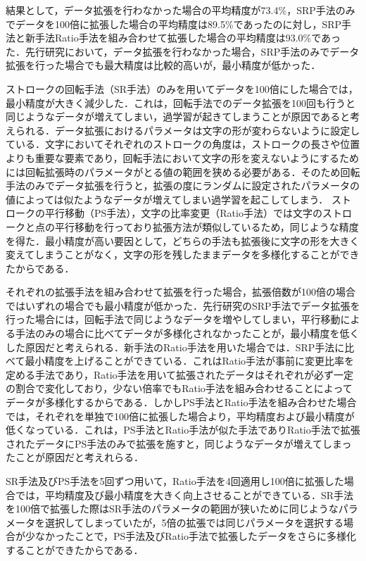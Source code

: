  結果として，データ拡張を行わなかった場合の平均精度が73.4\%，SRP手法のみでデータを100倍に拡張した場合の平均精度は89.5\%であったのに対し，SRP手法と新手法Ratio手法を組み合わせて拡張した場合の平均精度は93.0\%であった．先行研究\cite{takahashi}において，データ拡張を行わなかった場合，SRP手法のみでデータ拡張を行った場合でも最大精度は比較的高いが，最小精度が低かった．
 
ストロークの回転手法（SR手法）のみを用いてデータを100倍にした場合では，最小精度が大きく減少した．これは，回転手法でのデータ拡張を100回も行うと同じようなデータが増えてしまい，過学習が起きてしまうことが原因であると考えられる．データ拡張におけるパラメータは文字の形が変わらないように設定している．文字においてそれぞれのストロークの角度は，ストロークの長さや位置よりも重要な要素であり，回転手法において文字の形を変えないようにするためには回転拡張時のパラメータがとる値の範囲を狭める必要がある．そのため回転手法のみでデータ拡張を行うと，拡張の度にランダムに設定されたパラメータの値によっては似たようなデータが増えてしまい過学習を起こしてしまう．
ストロークの平行移動（PS手法），文字の比率変更（Ratio手法）では文字のストロークと点の平行移動を行っており拡張方法が類似しているため，同じような精度を得た．最小精度が高い要因として，どちらの手法も拡張後に文字の形を大きく変えてしまうことがなく，文字の形を残したままデータを多様化することができたからである．

それぞれの拡張手法を組み合わせて拡張を行った場合，拡張倍数が100倍の場合ではいずれの場合でも最小精度が低かった．先行研究\cite{takahashi}のSRP手法でデータ拡張を行った場合には，回転手法で同じようなデータを増やしてしまい，平行移動による手法のみの場合に比べてデータが多様化されなかったことが，最小精度を低くした原因だと考えられる．新手法のRatio手法を用いた場合では．SRP手法に比べて最小精度を上げることができている．これはRatio手法が事前に変更比率を定める手法であり，Ratio手法を用いて拡張されたデータはそれぞれが必ず一定の割合で変化しており，少ない倍率でもRatio手法を組み合わせることによってデータが多様化するからである．しかしPS手法とRatio手法を組み合わせた場合では，それぞれを単独で100倍に拡張した場合より，平均精度および最小精度が低くなっている．これは，PS手法とRatio手法が似た手法でありRatio手法で拡張されたデータにPS手法のみで拡張を施すと，同じようなデータが増えてしまったことが原因だと考えれらる．

SR手法及びPS手法を5回ずつ用いて，Ratio手法を4回適用し100倍に拡張した場合では，平均精度及び最小精度を大きく向上させることができている．SR手法を100倍で拡張した際はSR手法のパラメータの範囲が狭いために同じようなパラメータを選択してしまっていたが，5倍の拡張では同じパラメータを選択する場合が少なかったことで，PS手法及びRatio手法で拡張したデータをさらに多様化することができたからである．

